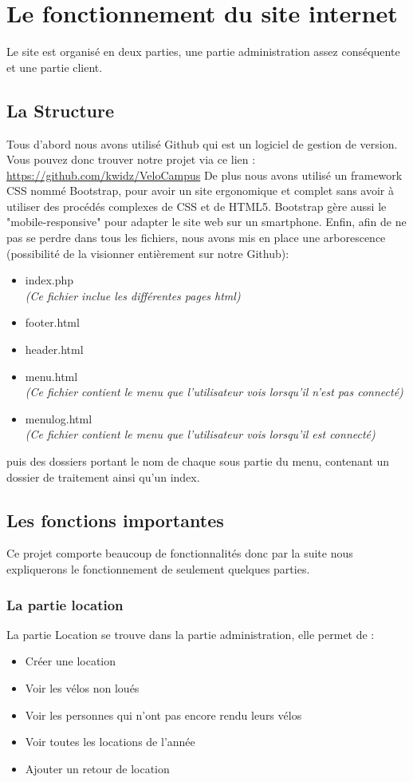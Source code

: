 \documentclass[11pt,a4paper,titlepage]{report}
\begin{document}
\chapter{Le fonctionnement du site internet}
Le site est organisé en deux parties, une partie administration assez conséquente et une partie client.
\section{La Structure}
Tous d'abord nous avons utilisé Github qui est un logiciel de gestion de version.
Vous pouvez donc trouver notre projet via ce lien :
\url{https://github.com/kwidz/VeloCampus}
De plus nous avons utilisé un framework CSS nommé Bootstrap, pour avoir un site ergonomique et complet sans avoir à utiliser des procédés complexes de CSS et de HTML5. Bootstrap gère aussi le "mobile-responsive" pour adapter le site web sur un smartphone.
Enfin, afin de ne pas se perdre dans tous les fichiers, nous avons mis en place une arborescence (possibilité de la visionner entièrement sur notre Github):
\begin{itemize}
\item index.php \\
\textit{(Ce fichier inclue les différentes pages html)}
\item footer.html
\item header.html
\item menu.html \\
\textit{(Ce fichier contient le menu que l'utilisateur vois lorsqu'il n'est pas connecté)}
\item menulog.html \\
\textit{(Ce fichier contient le menu que l'utilisateur vois lorsqu'il est connecté)}
\end{itemize}
 puis des dossiers portant le nom de chaque sous partie du menu, contenant un dossier de traitement ainsi qu'un index.
 
\section{Les fonctions importantes}
Ce projet comporte beaucoup de fonctionnalités donc par la suite nous expliquerons le fonctionnement de seulement quelques parties.  
\subsection{La partie location}
La partie Location se trouve dans la partie administration, elle permet de : 
\begin{itemize}
\item Créer une location
\item Voir les vélos non loués
\item Voir les personnes qui n'ont pas encore rendu leurs vélos
\item Voir toutes les locations de l'année
\item Ajouter un retour de location 
\end{itemize}
\end{document}

